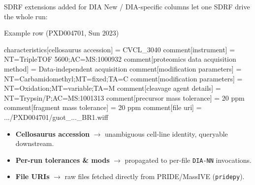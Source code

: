 \documentclass[aspectratio=169,11pt]{beamer}
\newcommand{\diann}{\texttt{DIA-NN}}
\begin{document}
\begin{frame}[fragile]{SDRF extensions added for DIA}
  New / DIA-specific columns let one SDRF drive the whole run:
  \vspace{0.4em}
  \begin{block}{Example row (PXD004701, Sun 2023)}
    \begin{semiverbatim}\scriptsize
characteristics[cellosaurus accession]  = CVCL_3040
comment[instrument]                     = NT=TripleTOF 5600;AC=MS:1000932
comment[proteomics data acquisition method] = Data-independent acquisition
comment[modification parameters]        = NT=Carbamidomethyl;MT=fixed;TA=C
comment[modification parameters]        = NT=Oxidation;MT=variable;TA=M
comment[cleavage agent details]         = NT=Trypsin/P;AC=MS:1001313
comment[precursor mass tolerance]       = 20 ppm
comment[fragment mass tolerance]        = 20 ppm
comment[file uri]                       = .../PXD004701/guot_..._BR1.wiff
    \end{semiverbatim}
  \end{block}
  \begin{itemize}\small
    \item \textbf{Cellosaurus accession} $\rightarrow$ unambiguous cell-line identity, queryable downstream.
    \item \textbf{Per-run tolerances \& mods} $\rightarrow$ propagated to per-file \diann{} invocations.
    \item \textbf{File URIs} $\rightarrow$ raw files fetched directly from PRIDE/MassIVE (\texttt{pridepy}).
  \end{itemize}
\end{frame}
\end{document}
